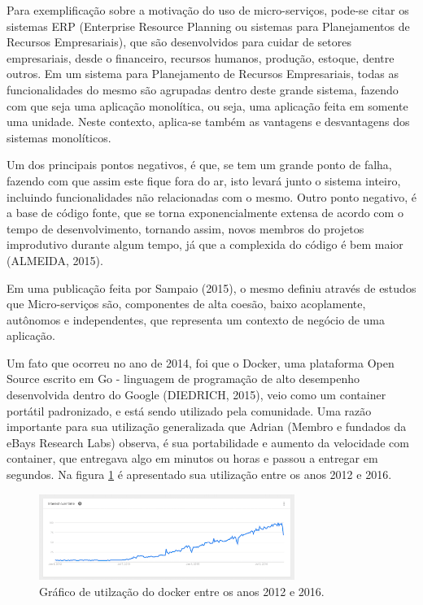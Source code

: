 \documentclass[journal]{IEEEtran}
\begin{document}
Para exemplificação sobre a motivação do uso de micro-serviços, pode-se citar os sistemas ERP (Enterprise Resource Planning ou sistemas para Planejamentos de Recursos Empresariais), que são desenvolvidos para cuidar de setores empresariais, desde o financeiro, recursos humanos, produção, estoque, dentre outros. Em um sistema para Planejamento de Recursos Empresariais, todas as funcionalidades do mesmo são agrupadas dentro deste grande sistema, fazendo com que seja uma aplicação monolítica, ou seja, uma aplicação feita em somente uma unidade. Neste contexto, aplica-se também as vantagens e desvantagens dos sistemas monolíticos.

Um dos principais pontos negativos, é que, se tem um grande ponto de falha, fazendo com que assim este fique fora do ar, isto levará junto o sistema inteiro, incluindo funcionalidades não relacionadas com o mesmo. Outro ponto negativo, é a base de código fonte, que se torna exponencialmente extensa de acordo com o tempo de desenvolvimento, tornando assim, novos membros do projetos improdutivo durante algum tempo, já que a complexida do código é bem maior (ALMEIDA, 2015).

Em uma publicação feita por Sampaio (2015), o mesmo definiu através de estudos que Micro-serviços são, componentes de alta coesão, baixo acoplamente, autônomos e independentes, que representa um contexto de negócio de uma aplicação.

Um fato que ocorreu no ano de 2014, foi que o Docker, uma plataforma Open Source escrito em Go - linguagem de programação de alto desempenho desenvolvida dentro do Google (DIEDRICH, 2015), veio como um container portátil padronizado, e está sendo utilizado pela comunidade. Uma razão importante para sua utilização generalizada que Adrian (Membro e fundados da eBays Research Labs) observa, é sua portabilidade e aumento da velocidade com container, que entregava algo em minutos ou horas e passou a entregar em segundos. Na figura \ref{fig:utilizacao-docker} é apresentado sua utilização entre os anos 2012 e 2016.

\begin{figure}[h]
\centering
\includegraphics[height=1.1in]{docker}
\caption{Gráfico de utilzação do docker entre os anos 2012 e 2016.}
\label{fig:utilizacao-docker}
\end{figure}
\end{document}
